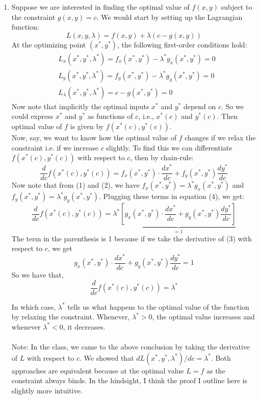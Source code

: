 \documentclass{./../../Latex/homework}
\begin{document}
\begin{enumerate}
\item Suppose we are interested in finding the optimal value of $f(x, y)$ subject to the constraint $g(x, y)=c$. We would start by setting up the Lagrangian function:
$$
L(x, y, \lambda)=f(x, y)+\lambda(c-g(x, y)) 
$$
\vspace{0.1em}
At the optimizing point $(x^{*}, y^{*})$, the following first-order conditions hold: 
\setcounter{equation}{0}
\begin{align}
&L_{x}(x^{*}, y^{*},\lambda^*)=f_{x}\left(x^{*}, y^{*}\right)-\lambda^{*} g_{x}\left(x^{*}, y^{*}\right)=0 \\
&L_{y}(x^{*}, y^{*},\lambda^*)=f_{y}\left(x^{*}, y^{*}\right)-\lambda^{*} g_{y}\left(x^{*}, y^{*}\right)=0 \\
&L_{\lambda}(x^{*}, y^{*},\lambda^*)=c-g\left(x^{*}, y^{*}\right)=0
\end{align}
Now note that implicitly the optimal inputs $x^{*}$ and $y^{*}$ depend on $c$. So we could express $x^{*}$ and $y^{*}$ as functions of $c$, i.e., $x^{*}(c)$ and $y^{*}(c)$. Then optimal value of $f$ is given by $f\left(x^{*}(c), y^{*}(c)\right)$. \\
Now, say, we want to know how the optimal value of $f$ changes if we relax the constraint i.e. if we increase $c$ slightly. To find this we can differentiate $f\left(x^{*}(c), y^{*}(c)\right)$ with respect to $c$, then by chain-rule:
\begin{equation}
	\frac{d}{d c} f\left(x^{*}(c), y^{*}(c)\right)=f_{x}\left(x^{*}, y^{*}\right) \cdot \frac{d x^{*}}{d c}+f_{y}\left(x^{*}, y^{*}\right) \frac{d y^{*}}{d c} 
\end{equation} 
Now note that from (1) and (2), we have $f_{x}\left(x^{*}, y^{*}\right)=\lambda^{*} g_{x}\left(x^{*}, y^{*}\right)$ and $f_{y}\left(x^{*}, y^{*}\right)=\lambda^{*} g_{y}\left(x^{*}, y^{*}\right)$.  Plugging these terms in equation (4), we get: 
$$
	\frac{d}{d c} f\left(x^{*}(c), y^{*}(c)\right)=\lambda^* \underbrace{\left[g_{x}\left(x^{*}, y^{*}\right) \cdot \frac{d x^{*}}{d c}+g_{y}\left(x^{*}, y^{*}\right) \frac{d y^{*}}{d c}\right]}_{=1} 
$$
The term in the parenthesis is 1 because if we take the derivative of (3) with respect to $c$, we get
$$
g_{x}\left(x^{*}, y^{*}\right) \cdot \frac{d x^{*}}{d c}+g_{y}\left(x^{*}, y^{*}\right) \frac{d y^{*}}{d c} = 1 $$
So we have that,
$$\frac{d}{d c} f\left(x^{*}(c), y^{*}(c)\right)=\lambda^*$$

In which case, $\lambda^{*}$ tells us what happens to the optimal value of the function by relaxing the constraint. Whenever, $\lambda^{*}>0$, the optimal value increases and whenever $\lambda^{*}<0$, it decreases. \\~\\
Note: In the class, we came to the above conclusion by taking the derivative of $L$ with respect to $c$. We showed that $ d L (x^{*}, y^{*},\lambda^*)/dc = \lambda^*$. Both approaches are equivalent because at the optimal value $L=f$ as the constraint always binds. In the hindsight, I think the proof I outline here is slightly more intuitive. \\~\\


\end{enumerate}
\end{document}
